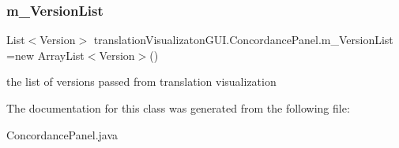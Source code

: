 \subsubsection{\texorpdfstring{m\+\_\+\+Version\+List}{m\_VersionList}}
{\footnotesize\ttfamily List$<$Version$>$ translation\+Visualizaton\+G\+U\+I.\+Concordance\+Panel.\+m\+\_\+\+Version\+List =new Array\+List$<$Version$>$()}

the list of versions passed from translation visualization 

The documentation for this class was generated from the following file\+:\begin{DoxyCompactItemize}
\item 
Concordance\+Panel.\+java\end{DoxyCompactItemize}
